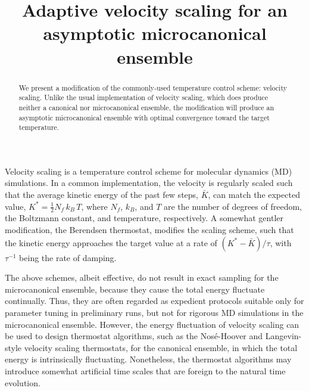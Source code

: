 \documentclass[reprint]{revtex4-1}
\begin{document}
\title{Adaptive velocity scaling for an asymptotic
microcanonical ensemble}
\author{}
\begin{abstract}
  We present a modification of the commonly-used
  temperature control scheme: velocity scaling.
  Unlike the usual implementation of velocity scaling,
  which does produce neither a canonical nor microcanonical ensemble,
  the modification will produce an asymptotic microcanonical ensemble
  with optimal convergence toward the target temperature.
\end{abstract}

\maketitle



Velocity scaling is a temperature control scheme
for molecular dynamics (MD) simulations.
%
In a common implementation,
the velocity is regularly scaled such that the average
kinetic energy of the past few steps, $\bar K$,
can match the expected value,
$K^* = \frac{1}{2} N_f \, k_B \, T$,
where $N_f$, $k_B$, and $T$ are the number of degrees of freedom,
the Boltzmann constant, and temperature, respectively.
%
A somewhat gentler modification, the Berendsen thermostat\cite{berendsen1984},
modifies the scaling scheme, such that
the kinetic energy approaches the target value at a rate of
$\left( K^* - \bar K \right)/\tau$,
with $\tau^{-1}$ being the rate of damping.

The above schemes, albeit effective,
do not result in exact sampling for the microcanonical ensemble\cite{hermansson1988},
because they cause the total energy fluctuate continually.
%
Thus, they are often regarded as expedient protocols
suitable only for parameter tuning in preliminary runs,
but not for rigorous MD simulations in the microcanonical ensemble.
%
However, the energy fluctuation of velocity scaling
can be used to design thermostat algorithms,
such as the Nos\'e-Hoover\cite{nose1984, nose1984mp, hoover1985, martyna1992}
and Langevin-style velocity scaling\cite{bussi2007} thermostats,
for the canonical ensemble, in which the total energy
is intrinsically fluctuating.
%
Nonetheless, the thermostat algorithms may introduce
somewhat artificial time scales that are foreign to the natural time evolution.
\end{document}
